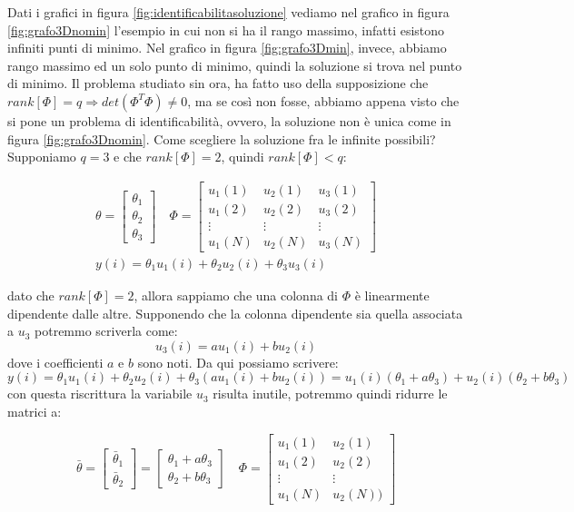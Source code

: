Dati i grafici in figura \ref{fig:identificabilitasoluzione} vediamo nel grafico in figura \ref{fig:grafo3Dnomin} l'esempio in cui non si ha il rango massimo, infatti esistono infiniti punti di minimo. Nel grafico in figura \ref{fig:grafo3Dmin}, invece, abbiamo rango massimo ed un solo punto di minimo, quindi la soluzione si trova nel punto di minimo.\newline
Il problema studiato sin ora, ha fatto uso della supposizione che $rank[\Phi]=q\Rightarrow det(\Phi^T\Phi)\ne 0$, ma se così non fosse, abbiamo appena visto che si pone un problema di identificabilità, ovvero, la soluzione non è unica come in figura \ref{fig:grafo3Dnomin}. Come scegliere la soluzione fra le infinite possibili? Supponiamo $q=3$ e che $rank[\Phi]=2$, quindi $rank[\Phi]<q$:

  \begin{gather*}
    \theta = \begin{bmatrix} \theta_1 \\ \theta_2 \\ \theta_3 \end{bmatrix}\quad
    \Phi=\begin{bmatrix} u_1(1) & u_2(1) & u_3(1) \\ u_1(2) & u_2(2) & u_3(2) \\ \vdots & \vdots & \vdots \\ u_1(N) &u_2(N) & u_3(N) \end{bmatrix}\\
    y(i)=\theta_1u_1(i)+\theta_2u_2(i)+\theta_3u_3(i)
  \end{gather*}
  
dato che $rank[\Phi]=2$, allora sappiamo che una colonna di $\Phi$ è linearmente dipendente dalle altre. Supponendo che la colonna dipendente sia quella associata a $u_3$ potremmo scriverla come:
  \[ u_3(i)=au_1(i)+bu_2(i) \]
dove i coefficienti $a$ e $b$ sono noti. Da qui possiamo scrivere:
  \[ y(i)=\theta_1u_1(i)+\theta_2u_2(i)+\theta_3(au_1(i)+bu_2(i)) = u_1(i)(\theta_1+a\theta_3)+u_2(i)(\theta_2+b\theta_3) \]
con questa riscrittura la variabile $u_3$ risulta inutile, potremmo quindi ridurre le matrici a:

    \[
      \bar{\theta} = \begin{bmatrix} \bar{\theta}_1 \\ \bar{\theta}_2 \end{bmatrix}= \begin{bmatrix}\theta_1+a\theta_3 \\ \theta_2+b\theta_3 \end{bmatrix} \quad
      \Phi=\begin{bmatrix} u_1(1) & u_2(1)  \\ u_1(2) & u_2(2)  \\ \vdots & \vdots  \\ u_1(N) &u_2(N) ) \end{bmatrix}
    \]
    
